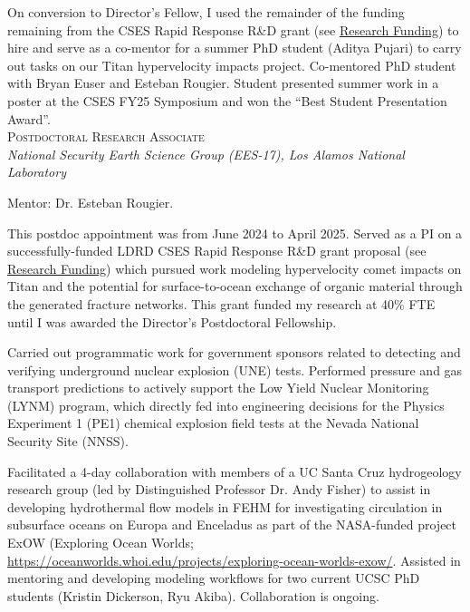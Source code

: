 \documentclass[11pt, letterpaper]{article}
\newcommand{\years}[1]{\marginnote{\scriptsize #1}}
\begin{document}
    On conversion to Director's Fellow, I used the remainder of the funding
    remaining from the CSES Rapid Response R\&D grant (see
    \hyperref[sec:funding]{Research Funding}) to hire and serve as a co-mentor
    for a summer PhD student (Aditya Pujari) to carry out tasks on our Titan
    hypervelocity impacts project. Co-mentored PhD student with Bryan Euser and
    Esteban Rougier. Student presented summer work in a poster at the CSES FY25
    Symposium and won the  ``Best Student Presentation Award''.  \\


\noindent
\years{2024 - 2025}\textsc{Postdoctoral Research Associate}\\
\textit{National Security Earth Science Group (EES-17), Los Alamos National Laboratory}

    \vspace{3pt} \noindent  
    Mentor: Dr. Esteban Rougier. 

    This postdoc appointment was from June 2024 to April 2025. 
    Served as a PI on a successfully-funded LDRD CSES Rapid Response
    R\&D grant proposal (see \hyperref[sec:funding]{Research Funding}) which
    pursued work modeling hypervelocity comet impacts on Titan and the
    potential for surface-to-ocean exchange of organic material through the
    generated fracture networks. This grant funded my research at 
    40\% FTE until I was awarded the Director's Postdoctoral Fellowship.

    Carried out programmatic work for government sponsors related to detecting
    and verifying underground nuclear explosion (UNE) tests. Performed pressure
    and gas transport predictions to actively support the Low Yield Nuclear Monitoring
    (LYNM) program, which directly fed into engineering decisions for the
    Physics Experiment 1 (PE1) chemical explosion field tests at the Nevada
    National Security Site (NNSS). 
 
    Facilitated a 4-day collaboration with members of a UC Santa Cruz
    hydrogeology research group (led by Distinguished Professor Dr. Andy
    Fisher) to assist in developing hydrothermal flow models in FEHM for
    investigating circulation in subsurface oceans on Europa and Enceladus as
    part of the NASA-funded project ExOW (Exploring Ocean Worlds;
        \href{https://oceanworlds.whoi.edu/projects/exploring-ocean-worlds-exow/}{https://oceanworlds.whoi.edu/projects/exploring-ocean-worlds-exow/}.
        Assisted in mentoring and developing modeling workflows for two current
        UCSC PhD students (Kristin Dickerson, Ryu Akiba). Collaboration is
        ongoing. \\
\end{document}
